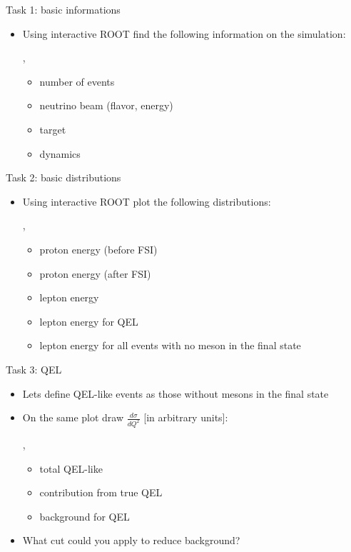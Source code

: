 \begin{slide}[toc=Task 1]{Task 1: basic informations}
\null\vfill

  \begin{itemize}
    \item Using interactive ROOT find the following information on the simulation:
    
    \sep
    
    \begin{itemize}
     \item number of events
     \item neutrino beam (flavor, energy)
     \item target
     \item dynamics
    \end{itemize}
  \end{itemize}

\vfill\null
\end{slide}

\begin{slide}[toc=Task 2]{Task 2: basic distributions}
\null\vfill

  \begin{itemize}
    \item Using interactive ROOT plot the following distributions:
    
    \sep
    
    \begin{itemize}
     \item proton energy (before FSI)
     \item proton energy (after FSI)
     \item lepton energy
     \item lepton energy for QEL
     \item lepton energy for all events with no meson in the final state
    \end{itemize}
  \end{itemize}

\vfill\null
\end{slide}

\begin{slide}[toc=Task 3]{Task 3: QEL}
\null\vfill

  \begin{itemize}
    \item Lets define QEL-like events as those without mesons in the final state
    \item On the same plot draw $\frac{d\sigma}{dQ^2}$ [in arbitrary units]:
    
    \sep
    
    \begin{itemize}
      \item total QEL-like
      \item contribution from true QEL
      \item background for QEL
    \end{itemize}

    \item What cut could you apply to reduce background?
    
  \end{itemize}

\vfill\null
\end{slide}

